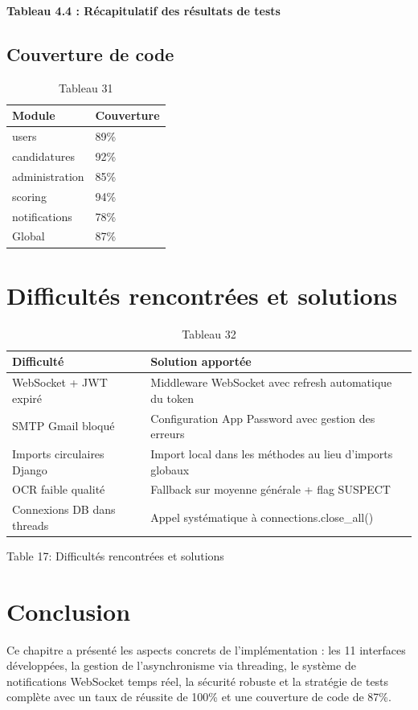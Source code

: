 \textbf{Tableau 4.4 : Récapitulatif des résultats de tests}

\subsection{Couverture de code}

\begin{table}[htbp]
\centering
\begin{tabular}{|l|l|}
\hline
Module & Couverture \\
\hline
users & 89\% \\
\hline
candidatures & 92\% \\
\hline
administration & 85\% \\
\hline
scoring & 94\% \\
\hline
notifications & 78\% \\
\hline
Global & 87\% \\
\hline
\end{tabular}
\caption{Tableau 31}
\label{tab:table_31}
\end{table}

\section{Difficultés rencontrées et solutions}

\begin{table}[htbp]
\centering
\begin{tabular}{|l|l|}
\hline
Difficulté & Solution apportée \\
\hline
WebSocket + JWT expiré & Middleware WebSocket avec refresh automatique du token \\
\hline
SMTP Gmail bloqué & Configuration App Password avec gestion des erreurs \\
\hline
Imports circulaires Django & Import local dans les méthodes au lieu d'imports globaux \\
\hline
OCR faible qualité & Fallback sur moyenne générale + flag SUSPECT \\
\hline
Connexions DB dans threads & Appel systématique à connections.close\_all() \\
\hline
\end{tabular}
\caption{Tableau 32}
\label{tab:table_32}
\end{table}

Table 17: Difficultés rencontrées et solutions

\section{Conclusion}

Ce chapitre a présenté les aspects concrets de l'implémentation : les 11 interfaces développées, la gestion de l'asynchronisme via threading, le système de notifications WebSocket temps réel, la sécurité robuste et la stratégie de tests complète avec un taux de réussite de 100\% et une couverture de code de 87\%.

